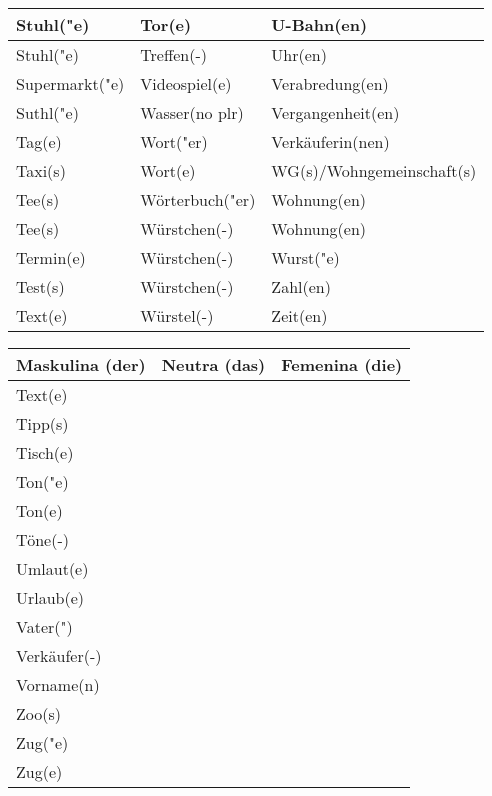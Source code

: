 \documentclass{article}
\renewcommand{\arraystretch}{1}
\begin{document}
\begin{table}[h!]
\begin{tabular}{|>{\raggedright\arraybackslash}p{5cm}|>{\raggedright\arraybackslash}p{5cm}|>{\raggedright\arraybackslash}p{5cm}|}
        Stuhl("e) & Tor(e) & U-Bahn(en) \\\hline
        Stuhl("e) & Treffen(-) & Uhr(en) \\\hline
        Supermarkt("e) & Videospiel(e) & Verabredung(en) \\\hline
        Suthl("e) & Wasser(no plr) & Vergangenheit(en) \\\hline
        Tag(e) & Wort("er) & Verkäuferin(nen) \\\hline
        Taxi(s) & Wort(e) & WG(s)/Wohngemeinschaft(s) \\\hline
        Tee(s) & Wörterbuch("er) & Wohnung(en) \\\hline
        Tee(s) & Würstchen(-) & Wohnung(en) \\\hline
        Termin(e) & Würstchen(-) & Wurst("e) \\\hline
        Test(s) & Würstchen(-) & Zahl(en) \\\hline
        Text(e) & Würstel(-) & Zeit(en) \\\hline
    \end{tabular}
\end{table}

\newpage

\begin{table}[h!]
    \centering
    \renewcommand{\arraystretch}{1.5}
    \begin{tabular}{|>{\raggedright\arraybackslash}p{5cm}|>{\raggedright\arraybackslash}p{5cm}|>{\raggedright\arraybackslash}p{5cm}|}
        \hline
        \rowcolor{gray!20} \textbf{Maskulina (der)} & \textbf{Neutra (das)} & \textbf{Femenina (die)} \\
        \hline
        Text(e) &  &  \\\hline
        Tipp(s) &  &  \\\hline
        Tisch(e) &  &  \\\hline
        Ton("e) &  &  \\\hline
        Ton(e) &  &  \\\hline
        Töne(-) &  &  \\\hline
        Umlaut(e) &  &  \\\hline
        Urlaub(e) &  &  \\\hline
        Vater(") &  &  \\\hline
        Verkäufer(-) &  &  \\\hline
        Vorname(n) &  &  \\\hline
        Zoo(s) &  &  \\\hline
        Zug("e) &  &  \\\hline
        Zug(e) &  &  \\\hline
    \end{tabular}
\end{table}

\newpage
\end{document}
